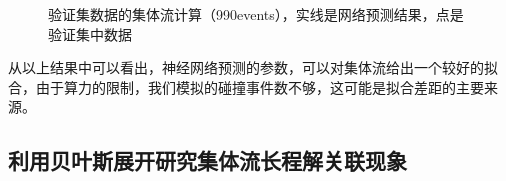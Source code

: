 \documentclass[aps,pre,12pt,preprint,onecolumn,showpacs,showkeys]{revtex4-1}
\begin{document}
\begin{figure}[htbp]
    \centering
    \caption{验证集数据的集体流计算（990events），实线是网络预测结果，点是验证集中数据\label{fig:valid}}%
    \end{figure}
从以上结果中可以看出，神经网络预测的参数，可以对集体流给出一个较好的拟合，由于算力的限制，我们模拟的碰撞事件数不够，这可能是拟合差距的主要来源。
\subsection{利用贝叶斯展开研究集体流长程解关联现象}
\end{document}
